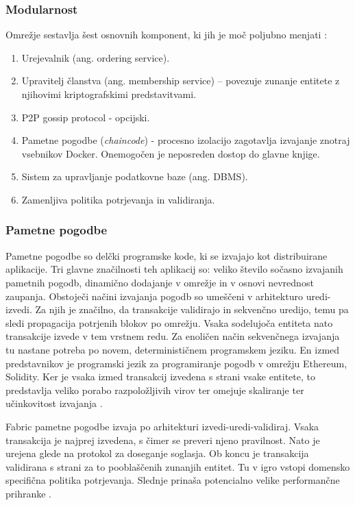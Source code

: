 \documentclass[a4paper, 12pt]{book}
\begin{document}
\subsubsection{Modularnost}
Omrežje sestavlja šest osnovnih komponent, ki jih je moč poljubno menjati \cite{hyperledgerDocs}:
\begin{enumerate}
	\item Urejevalnik (ang. ordering service).
	\item Upravitelj članstva (ang. membership service) -- povezuje zunanje entitete z njihovimi kriptografskimi predstavitvami.
	\item P2P gossip protocol - opcijski.
	\item Pametne pogodbe (\textit{chaincode}) - procesno izolacijo zagotavlja izvajanje znotraj vsebnikov Docker. 
	Onemogočen je neposreden dostop do glavne knjige.
	\item Sistem za upravljanje podatkovne baze (ang. DBMS).
	\item Zamenljiva politika potrjevanja in validiranja.
\end{enumerate}

\subsubsection{Pametne pogodbe}
Pametne pogodbe so delčki programske kode, ki se izvajajo kot distribuirane aplikacije.
Tri glavne značilnosti teh aplikacij so: veliko število sočasno izvajanih pametnih pogodb, dinamično dodajanje v omrežje in v osnovi nevrednost zaupanja.
Obstoječi načini izvajanja pogodb so umeščeni v arhitekturo uredi-izvedi.
Za njih je značilno, da transakcije validirajo in sekvenčno uredijo, temu pa sledi propagacija potrjenih blokov po omrežju.
Vsaka sodelujoča entiteta nato transakcije izvede v tem vrstnem redu.
Za enoličen način sekvenčnega izvajanja tu nastane potreba po novem, determinističnem programskem jeziku.
En izmed predstavnikov je programski jezik za programiranje pogodb v omrežju Ethereum, Solidity.
Ker je vsaka izmed transakcij izvedena s strani vsake entitete, to predstavlja veliko porabo razpoložljivih virov ter omejuje skaliranje ter učinkovitost izvajanja \cite{hyperledgerDocs}.

Fabric pametne pogodbe izvaja po arhitekturi izvedi-uredi-validiraj.
Vsaka transakcija je najprej izvedena, s čimer se preveri njeno pravilnost.
Nato je urejena glede na protokol za doseganje soglasja.
Ob koncu je transakcija validirana s strani za to pooblaščenih zunanjih entitet.
Tu v igro vstopi domensko specifična politika potrjevanja.
Slednje prinaša potencialno velike performančne prihranke \cite{hyperledgerDocs}.
\end{document}
